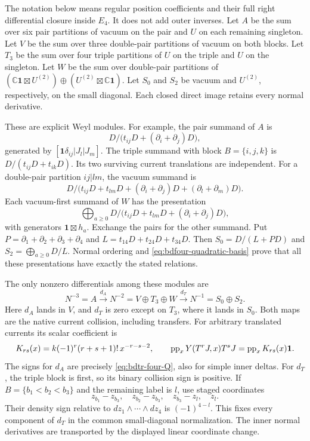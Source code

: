 The notation below means regular position coefficients and their full right differential closure inside $E_4$.
It does not add outer inverses.
Let $A$ be the sum over six pair partitions of vacuum on the pair and $U$ on each remaining singleton.
Let $V$ be the sum over three double-pair partitions of vacuum on both blocks.
Let $T_3$ be the sum over four triple partitions of $U$ on the triple and $U$ on the singleton.
Let $W$ be the sum over double-pair partitions of
$(\mathbb C\mathbf1\boxtimes U^{(2)})\oplus(U^{(2)}\boxtimes\mathbb C\mathbf1)$.
Let $S_0$ and $S_2$ be vacuum and $U^{(2)}$, respectively, on the small diagonal.
Each closed direct image retains every normal derivative.

These are explicit Weyl modules.
For example, the pair summand of $A$ is
\[
 D/\bigl(t_{ij}D+(\partial_i+\partial_j)D\bigr),
\]
generated by $[\mathbf1\delta_{ij}|J_l|J_m]$.
The triple summand with block $B=\{i,j,k\}$ is
$D/(t_{ij}D+t_{ik}D)$.
Its two surviving current translations are independent.
For a double-pair partition $ij|lm$, the vacuum summand is
\[
 D/\bigl(t_{ij}D+t_{lm}D+(\partial_i+\partial_j)D
                                  +(\partial_l+\partial_m)D\bigr).
\]
Each vacuum-first summand of $W$ has the presentation
\[
 \bigoplus_{a\geq0}
 D/\bigl(t_{ij}D+t_{lm}D+(\partial_i+\partial_j)D\bigr),
\]
with generators $\mathbf1\boxtimes h_a$.
Exchange the pairs for the other summand.
Put $P=\partial_1+\partial_2+\partial_3+\partial_4$ and
$L=t_{14}D+t_{24}D+t_{34}D$.
Then $S_0=D/(L+PD)$ and $S_2=\bigoplus_{a\geq0}D/L$.
Normal ordering and \eqref{eq:bdfour-quadratic-basis} prove that all these presentations have exactly the stated relations.

The only nonzero differentials among these modules are
\begin{equation}\label{eq:bdfour-N}
 N^{-3}=A\xrightarrow{d_A}N^{-2}=V\oplus T_3\oplus W
       \xrightarrow{d_T}N^{-1}=S_0\oplus S_2.
\end{equation}
Here $d_A$ lands in $V$, and $d_T$ is zero except on $T_3$, where it lands in $S_0$.
Both maps are the native current collision, including transfers.
For arbitrary translated currents its scalar coefficient is
\begin{equation}\label{eq:bdfour-current-contraction}
 K_{rs}(x)=k(-1)^r(r+s+1)!\,x^{-r-s-2},
 \qquad
 \operatorname{pp}_xY(T^rJ,x)T^sJ=\operatorname{pp}_xK_{rs}(x)\mathbf1.
\end{equation}
The signs for $d_A$ are precisely \eqref{eq:bdtr-four-Q}, also for simple inner deltas.
For $d_T$, the triple block is first, so its binary collision sign is positive.
If $B=\{b_1<b_2<b_3\}$ and the remaining label is $l$, use staged coordinates
\[
 z_{b_1}-z_{b_3},\quad z_{b_2}-z_{b_3},\quad
 z_{b_3}-z_l,\quad z_l.
\]
Their density sign relative to $dz_1\wedge\cdots\wedge dz_4$ is $(-1)^{4-l}$.
This fixes every component of $d_T$ in the common small-diagonal normalization.
The inner normal derivatives are transported by the displayed linear coordinate change.

